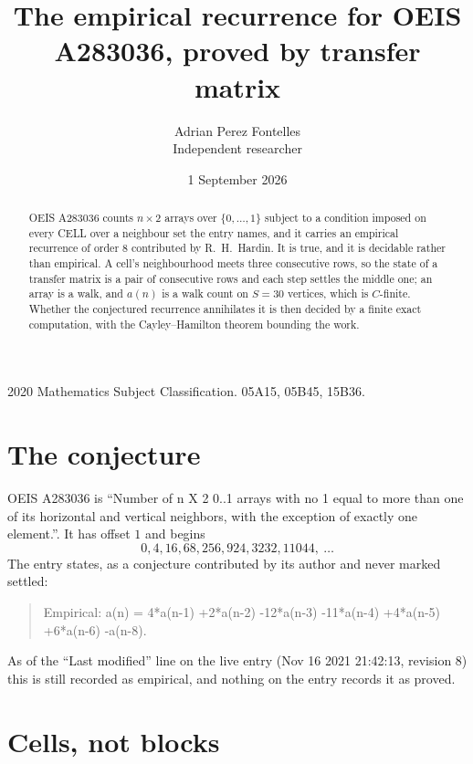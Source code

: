 \documentclass[11pt,a4paper]{article}
\title{The empirical recurrence for OEIS A283036, proved by transfer matrix}
\author{Adrian Perez Fontelles\\ \small Independent researcher}
\date{1 September 2026}
\theoremstyle{plain}
\theoremstyle{definition}
\begin{document}
\maketitle

\begin{abstract}
OEIS A283036 counts $n\times2$ arrays over $\{0,\dots,1\}$ subject to a condition imposed on
every CELL over a neighbour set the entry names, and it carries an empirical recurrence of
order $8$ contributed by R.~H.~Hardin. It is true, and it is decidable rather than
empirical. A cell's neighbourhood meets three consecutive rows, so the state of a transfer
matrix is a pair of consecutive rows and each step settles the middle one; an array is a
walk, and $a(n)$ is a walk count on $S=30$ vertices, which is $C$-finite. Whether the
conjectured recurrence annihilates it is then decided by a finite exact computation, with the
Cayley--Hamilton theorem bounding the work.
\end{abstract}

\noindent\small 2020 Mathematics Subject Classification. 05A15, 05B45, 15B36.\normalsize

\section{The conjecture}

OEIS A283036 is ``Number of n X 2 0..1 arrays with no 1 equal to more than one of its horizontal and vertical neighbors, with the exception of exactly one element.''. It has offset $1$ and begins
\[
0, 4, 16, 68, 256, 924, 3232, 11044,\ \dots
\]
The entry states, as a conjecture contributed by its author and never marked settled:
\begin{quote}
Empirical: a(n) = 4*a(n-1) +2*a(n-2) -12*a(n-3) -11*a(n-4) +4*a(n-5) +6*a(n-6) -a(n-8).
\end{quote}
As of the ``Last modified'' line on the live entry (Nov 16 2021 21:42:13, revision 8) this is still
recorded as empirical, and nothing on the entry records it as proved.

\section{Cells, not blocks}
\end{document}
